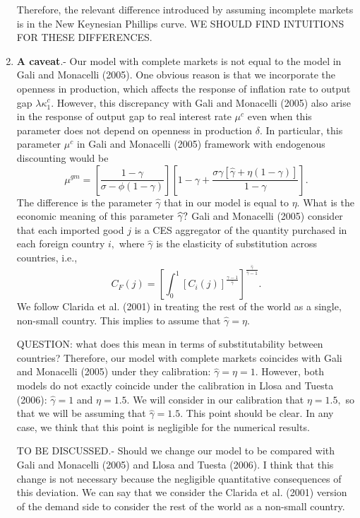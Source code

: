 \documentclass{article}
\begin{document}
\begin{enumerate}
Therefore, the relevant difference introduced by assuming incomplete markets
is in the New Keynesian Phillips curve. WE SHOULD FIND INTUITIONS FOR THESE
DIFFERENCES.

\item \textbf{A caveat}.- Our model with complete markets is not equal to
the model in Gali and Monacelli (2005). One obvious reason is that we
incorporate the openness in production, which affects the response of
inflation rate to output gap $\lambda \kappa _{1}^{c}.$ However, this
discrepancy with Gali and Monacelli (2005) also arise in the response of
output gap to real interest rate $\mu ^{c}$ even when this parameter does
not depend on openness in production $\delta .$ In particular, this
parameter $\mu ^{c}$ in Gali and Monacelli (2005) framework with endogenous
discounting would be 
\begin{equation*}
\mu ^{gm}=\left[ \frac{1-\gamma }{\sigma -\phi \left( 1-\gamma \right) }%
\right] \left[ 1-\gamma +\frac{\sigma \gamma \left[ \widehat{\gamma }+\eta
\left( 1-\gamma \right) \right] }{1-\gamma }\right] .
\end{equation*}%
The difference is the parameter $\widehat{\gamma }$ that in our model is
equal to $\eta .$ What is the economic meaning of this parameter $\widehat{%
\gamma }?$ Gali and Monacelli (2005) consider that each imported good $j$ is
a CES aggregator of the quantity purchased in each foreign country $i,$
where $\widehat{\gamma }$ is the elasticity of substitution across
countries, i.e., 
\begin{equation*}
C_{F}(j)=\left[ \int_{0}^{1}\left[ C_{i}(j)\right] ^{\frac{\widehat{\gamma }%
-1}{\widehat{\gamma }}}\right] ^{\frac{\widehat{\gamma }}{\widehat{\gamma }-1%
}}.
\end{equation*}%
We follow Clarida et al. (2001) in treating the rest of the world as a
single, non-small country. This implies to assume that $\widehat{\gamma }%
=\eta .$

QUESTION: what does this mean in terms of substitutability between
countries? Therefore, our model with complete markets coincides with Gali
and Monacelli (2005) under they calibration: $\widehat{\gamma }=\eta =1.$
However, both models do not exactly coincide under the calibration in Llosa
and Tuesta (2006): $\widehat{\gamma }=1$ and $\eta =1.5.$ We will consider
in our calibration that $\eta =1.5,$ so that we will be assuming that $%
\widehat{\gamma }=1.5.$ This point should be clear. In any case, we think
that this point is negligible for the numerical results.

TO BE DISCUSSED.- Should we change our model to be compared with Gali and
Monacelli (2005) and Llosa and Tuesta (2006). I think that this change is
not necessary because the negligible quantitative consequences of this
deviation. We can say that we consider the Clarida et al. (2001) version of
the demand side to consider the rest of the world as a non-small country.
\end{enumerate}
\end{document}
